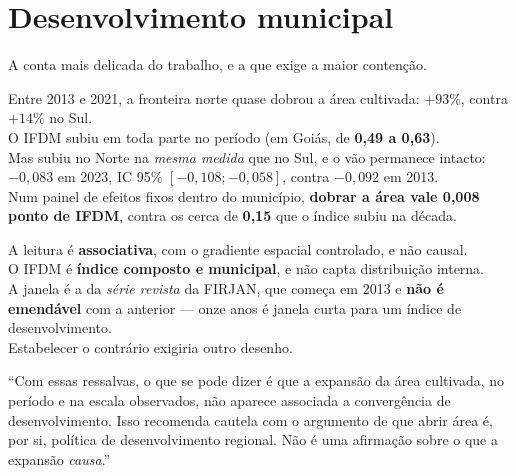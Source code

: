 \section{Desenvolvimento municipal}

A conta mais delicada do trabalho, e a que exige a maior contenção.

\begin{ancora}[Os números]
Entre 2013 e 2021, a fronteira norte quase dobrou a área cultivada:
\textbf{$+93\%$}, contra \textbf{$+14\%$} no Sul. \\
O IFDM subiu em toda parte no período (em Goiás, de \textbf{0,49 a 0,63}). \\
Mas subiu no Norte na \emph{mesma medida} que no Sul, e o vão permanece intacto:
\textbf{$-0{,}083$} em 2023, IC 95\% $[-0{,}108; -0{,}058]$, contra
\textbf{$-0{,}092$} em 2013. \\[4pt]
Num painel de efeitos fixos dentro do município, \textbf{dobrar a área vale
0,008 ponto de IFDM}, contra os cerca de \textbf{0,15} que o índice subiu na
década.
\end{ancora}

\begin{naodiz}
A leitura é \textbf{associativa}, com o gradiente espacial controlado, e não
causal. \\
O IFDM é \textbf{índice composto e municipal}, e não capta distribuição interna. \\
A janela é a da \emph{série revista} da FIRJAN, que começa em 2013 e \textbf{não
é emendável} com a anterior --- onze anos é janela curta para um índice de
desenvolvimento. \\
Estabelecer o contrário exigiria outro desenho.
\end{naodiz}

\begin{nabanca}
``Com essas ressalvas, o que se pode dizer é que a expansão da área cultivada,
no período e na escala observados, não aparece associada a convergência de
desenvolvimento. Isso recomenda cautela com o argumento de que abrir área é, por
si, política de desenvolvimento regional. Não é uma afirmação sobre o que a
expansão \emph{causa}.''
\end{nabanca}
